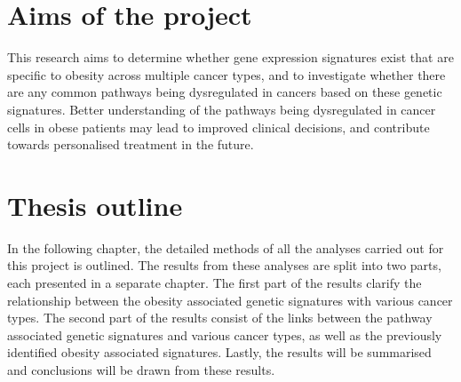 \section{Aims of the project}
\label{sec:aim}

This research aims to determine whether gene expression signatures exist  that are specific to obesity across multiple cancer types, and to investigate whether there are any common pathways being dysregulated in cancers based on these genetic signatures.
Better understanding of the pathways being dysregulated in cancer cells in obese patients may lead to improved clinical decisions, and contribute towards personalised treatment in the future.

\section{Thesis outline}
\label{sec:thesis_outline}

In the following chapter, the detailed methods of all the analyses carried out for this project is outlined.
The results from these analyses are split into two parts, each presented in a separate chapter.
The first part of the results clarify the relationship between the obesity associated genetic signatures with various cancer types.
The second part of the results consist of the links between the pathway associated genetic signatures and various cancer types, as well as the previously identified obesity associated signatures.
Lastly, the results will be summarised and conclusions will be drawn from these results.
